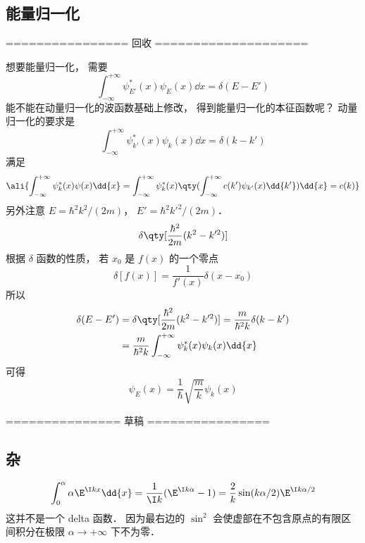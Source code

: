 \subsection{能量归一化}
================ 回收 ====================

想要能量归一化， 需要
\begin{equation}
\int_{-\infty}^{+\infty} \psi_{E'}^*(x) \psi_E(x) \dd{x}  = \delta (E - E')
\end{equation}
能不能在动量归一化的波函数基础上修改， 得到能量归一化的本征函数呢？
动量归一化的要求是
\begin{equation}
\int_{-\infty}^{+\infty} \psi_{k'}^*(x) \psi_k(x) \dd{x}  = \delta(k - k')
\end{equation}
满足
\begin{equation}\ali{
\int_{-\infty}^{+\infty} \psi_k^*(x) \psi(x) \dd{x}
= \int_{-\infty}^{+\infty} \psi_k^*(x) \qty(\int_{-\infty}^{+\infty} c(k')\psi_{k'}(x) \dd{k'}) \dd{x}
= c(k)
}\end{equation}
另外注意 $E = \hbar ^2 k^2/(2m)$， $E' = \hbar^2k'^2/(2m)$． 
\begin{equation}
\delta \qty[ \frac{\hbar ^2}{2m}(k^2 - k'^2)]
\end{equation}
根据 $\delta $ 函数的性质， 若 $x_0$ 是 $f(x)$ 的一个零点
\begin{equation}
\delta[f(x)] = \frac{1}{f'(x)}\delta (x - x_0)
\end{equation}
所以
\begin{equation}
\begin{aligned}
\delta (E - E') & = \delta \qty[\frac{\hbar^2}{2m}(k^2 - k'^2)] = \frac{m}{\hbar ^2 k}\delta (k - k') \\
&= \frac{m}{\hbar^2 k}\int_{-\infty }^{+\infty } \psi_k^*(x) \psi_k(x)\dd{x} 
\end{aligned}
\end{equation}
可得
\begin{equation}
\psi_E (x) = \frac{1}{\hbar} \sqrt{\frac{m}{k}} \psi_k(x)
\end{equation}


=============== 草稿 ================



\subsection{杂}
\begin{equation}
\int_0^\alpha\alpha \E^{\I kx} \dd{x} = \frac{1}{\I k} (\E^{\I k\alpha} - 1)
= \frac{2}{ k} \sin(k\alpha/2) \E^{\I k\alpha/2}
\end{equation}
这并不是一个 delta 函数． 因为最右边的 $\sin^2$ 会使虚部在不包含原点的有限区间积分在极限 $\alpha \to +\infty$ 下不为零．
